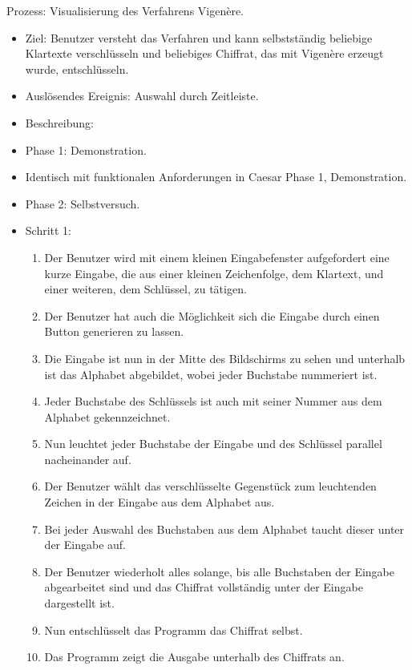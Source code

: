 \documentclass{article}
\begin{document}

\begin{FA}[start=120]
 \item Prozess: Visualisierung des Verfahrens Vigenère.
\end{FA}
\begin{itemize}[label={}]

 \item Ziel: Benutzer versteht das Verfahren und kann selbstständig beliebige Klartexte verschlüsseln und beliebiges Chiffrat, das mit Vigenère erzeugt wurde, entschlüsseln.

 \item Auslösendes Ereignis: Auswahl durch Zeitleiste.

 \item Beschreibung:

 \item Phase 1: Demonstration.

 \item Identisch mit funktionalen Anforderungen in Caesar Phase 1, Demonstration. 

 \item Phase 2: Selbstversuch.

 \item Schritt 1:

	\begin{enumerate}
	   \item Der Benutzer wird mit einem kleinen Eingabefenster aufgefordert eine kurze Eingabe, 
                 die aus einer kleinen Zeichenfolge, dem Klartext, und einer weiteren, dem Schlüssel, zu tätigen.
	   \item Der Benutzer hat auch die Möglichkeit sich die Eingabe durch einen Button generieren zu lassen.
	   \item Die Eingabe ist nun in der Mitte des Bildschirms zu sehen und unterhalb ist das Alphabet 
		 abgebildet, wobei jeder Buchstabe nummeriert ist.
	   \item Jeder Buchstabe des Schlüssels ist auch mit seiner Nummer aus dem Alphabet gekennzeichnet.
	   \item Nun leuchtet jeder Buchstabe der Eingabe und des Schlüssel parallel nacheinander auf.
	   \item Der Benutzer wählt das verschlüsselte Gegenstück zum leuchtenden Zeichen in der Eingabe aus dem Alphabet aus. 
	   \item Bei jeder Auswahl des Buchstaben aus dem Alphabet taucht dieser unter der Eingabe auf.
	   \item Der Benutzer wiederholt alles solange, bis alle Buchstaben der Eingabe abgearbeitet sind 
		   und das Chiffrat vollständig unter der Eingabe dargestellt ist.
	   \item Nun entschlüsselt das Programm das Chiffrat selbst.
	   \item Das Programm zeigt die Ausgabe unterhalb des Chiffrats an.
	\end{enumerate}


\end{itemize}
\end{document}
